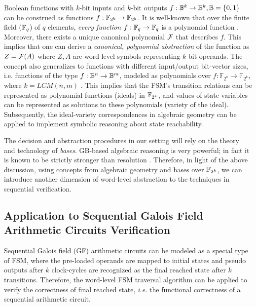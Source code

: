 Boolean functions with $k$-bit inputs and $k$-bit outputs 
$f: {\mathbb{B}}^k \rightarrow {\mathbb{B}}^k,{\mathbb{B}} = \{0, 1\}$ can be construed as functions
$f: {\mathbb{F}}_{2^k} \rightarrow {\mathbb{F}}_{2^k}$. It is well-known that over the finite
field (${\mathbb{F}}_{q}$) of  $q$ elements, {\it every function} $f: {\mathbb{F}}_{q}
\rightarrow {\mathbb{F}}_{q}$ is a polynomial function \cite{ff:1997}. Moreover,
there exists a unique canonical polynomial ${\mathcal{F}}$ that describes $f$.
This implies that one can derive a {\it  canonical, polynomial
  abstraction} of the function as $Z = {\mathcal{F}}(A)$ where $Z, A$ are
word-level symbols representing $k$-bit operands. The concept also
generalizes to functions with different input/output bit-vector sizes,
i.e. functions of the type $f: {\mathbb{B}}^n \rightarrow {\mathbb{B}}^m$, modeled as
polynomials over $f:{\mathbb{F}}_{2^k} \rightarrow
{\mathbb{F}}_{2^k}$, where $k=LCM(n,m)$ \cite{ff:1997}.  
This implies that the FSM's transition relations can be
represented as polynomial functions (ideals) in ${\mathbb{F}}_{2^k}$, and values of
state variables can be represented as solutions to these polynomials
(variety of the ideal). Subsequently, the ideal-variety correspondences
in algebraic geometry can be applied to implement symbolic reasoning
about state reachability. 

The decision and abstraction procedures in our setting will rely on
the theory and technology of {\it \Grobner bases}. GB-based
algebraic reasoning is very powerful; in fact it is known to be
strictly stronger than resolution \cite{CEI:stoc-96}. Therefore, in
light of the above discussion, using concepts from algebraic geometry
and \Grobner bases over ${\mathbb{F}}_{2^k}$, we can introduce another dimension of
word-level abstraction to the techniques in sequential verification. 

\subsection{Application to Sequential Galois Field Arithmetic Circuits Verification}
Sequential Galois field (GF) arithmetic circuits can be modeled as a special type of 
FSM, where the pre-loaded operands are mapped to initial states and pseudo outputs
after $k$ clock-cycles are recognized as the final reached state after $k$ transitions.
Therefore, the word-level FSM traversal algorithm can be applied to 
verify the correctness of final reached state, {\it i.e.} the functional correctness of
a sequential arithmetic circuit.

